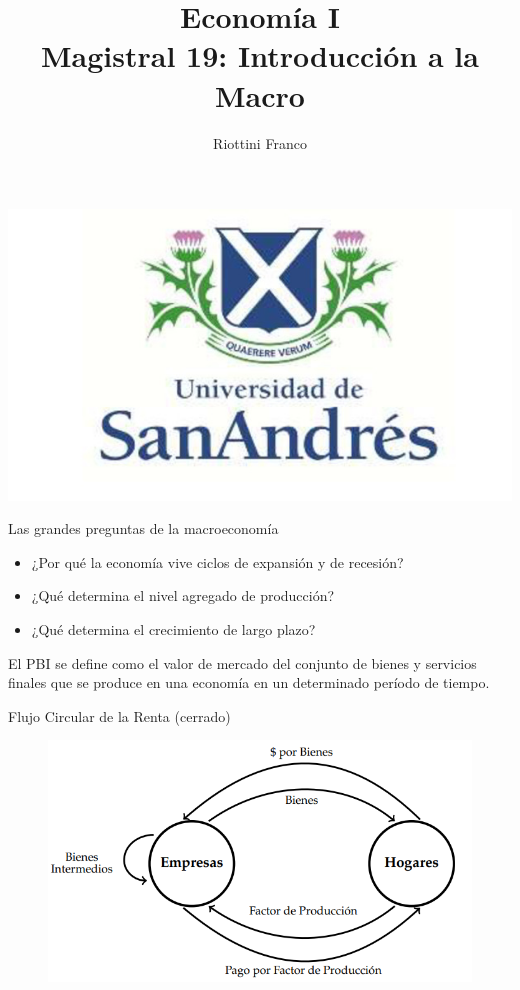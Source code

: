 \documentclass{beamer}
\title[Economía I]{Economía I \vspace{4mm}
\\ Magistral 19: Introducción a la Macro}
\date{}
\author[Riottini]{Riottini Franco}
\institute[]{Universidad de San Andrés}
\begin{document}
\begin{frame}
\titlepage
\centering

\includegraphics[scale=0.2]{../Figures/logoUDESA.jpg} 
\end{frame}

\begin{frame}{Las grandes preguntas de la macroeconomía}
    \begin{itemize}
        \item ¿Por qué la economía vive ciclos de expansión y de recesión?
        \item ¿Qué determina el nivel agregado de producción?
        \item ¿Qué determina el crecimiento de largo plazo?
    \end{itemize} \pause
    
    \begin{boxA}
        El PBI se define como el valor de mercado del conjunto de bienes y servicios finales que se produce en una economía en un
        determinado período de tiempo.
    \end{boxA}
\end{frame}

\begin{frame}{Flujo Circular de la Renta (cerrado)}
    \begin{figure} [H]   
        \includegraphics[scale=0.75]{../Figures/C29.1.png}
    \end{figure}
\end{frame}
\end{document}
